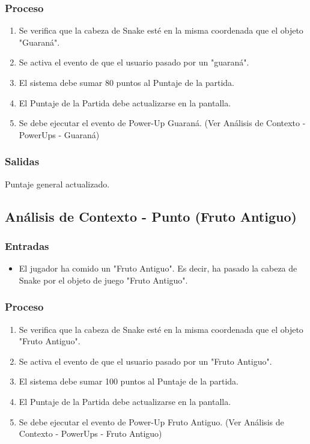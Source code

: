 \documentclass[letterpaper]{scrreprt}
\begin{document}
\subsubsection{Proceso}
\begin{enumerate}
	\item Se verifica que la cabeza de Snake esté en la misma coordenada que el objeto "Guaraná".
	\item Se activa el evento de que el usuario pasado por un "guaraná".
	\item El sistema debe sumar 80 puntos al Puntaje de la partida.
	\item El Puntaje de la Partida debe actualizarse en la pantalla.
	\item Se debe ejecutar el evento de Power-Up Guaraná. (Ver Análisis de Contexto - PowerUps - Guaraná)
\end{enumerate}
\subsubsection{Salidas}
Puntaje general actualizado.

\subsection{Análisis de Contexto - Punto (Fruto Antiguo)}
\subsubsection{Entradas}
\begin{itemize}
	\item El jugador ha comido un "Fruto Antiguo". Es decir, ha pasado la cabeza de Snake por el objeto de juego "Fruto Antiguo".
\end{itemize}
\subsubsection{Proceso}
\begin{enumerate}
	\item Se verifica que la cabeza de Snake esté en la misma coordenada que el objeto "Fruto Antiguo".
	\item Se activa el evento de que el usuario pasado por un "Fruto Antiguo".
	\item El sistema debe sumar 100 puntos al Puntaje de la partida.
	\item El Puntaje de la Partida debe actualizarse en la pantalla.
	\item Se debe ejecutar el evento de Power-Up Fruto Antiguo. (Ver Análisis de Contexto - PowerUps - Fruto Antiguo)
\end{enumerate}
\end{document}
